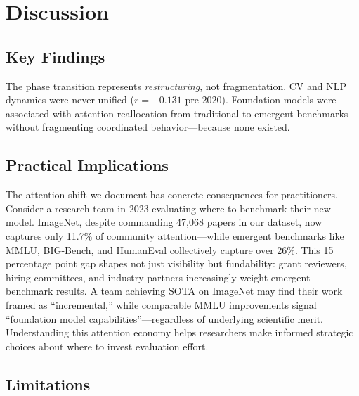 \section{Discussion}

\subsection{Key Findings}

The phase transition represents \emph{restructuring}, not fragmentation. CV and NLP dynamics were never unified ($r = -0.131$ pre-2020). Foundation models were associated with attention reallocation from traditional to emergent benchmarks without fragmenting coordinated behavior---because none existed.

\subsection{Practical Implications}

The attention shift we document has concrete consequences for practitioners. Consider a research team in 2023 evaluating where to benchmark their new model. ImageNet, despite commanding 47,068 papers in our dataset, now captures only 11.7\% of community attention---while emergent benchmarks like MMLU, BIG-Bench, and HumanEval collectively capture over 26\%. This 15 percentage point gap shapes not just visibility but fundability: grant reviewers, hiring committees, and industry partners increasingly weight emergent-benchmark results. A team achieving SOTA on ImageNet may find their work framed as ``incremental,'' while comparable MMLU improvements signal ``foundation model capabilities''---regardless of underlying scientific merit. Understanding this attention economy helps researchers make informed strategic choices about where to invest evaluation effort.

\subsection{Limitations}

